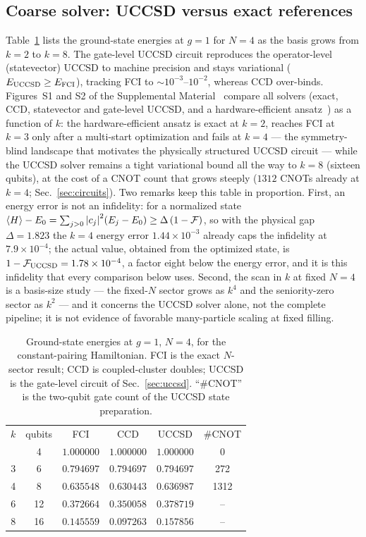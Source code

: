 \documentclass[
  aps,            %
  prc,            %
  reprint,        %
  superscriptaddress,
  floatfix,
  nofootinbib
]{revtex4-2}
\newcommand{\SM}{Supplemental Material~\cite{SM}}
\begin{document}
\subsection{Coarse solver: UCCSD versus exact references}
\label{sec:res-uccsd}
Table~\ref{tab:uccsd} lists the ground-state energies at $g=1$ for $N=4$ as the basis
grows from $k=2$ to $k=8$.  The gate-level UCCSD circuit reproduces the operator-level
(statevector) UCCSD to machine precision and stays variational ($E_{\rm UCCSD}\ge
E_{\rm FCI}$), tracking FCI to $\sim10^{-3}$--$10^{-2}$, whereas CCD over-binds.
Figures~S1 and S2 of the \SM{} compare all solvers (exact, CCD, statevector
and gate-level UCCSD, and a hardware-efficient ansatz~\cite{Kandala2017}) as
a function of $k$: the hardware-efficient ansatz is exact at $k=2$, reaches
FCI at $k=3$ only after a multi-start optimization and fails at $k=4$ --- the
symmetry-blind landscape that motivates the physically structured UCCSD
circuit --- while the UCCSD solver remains a tight variational bound all the
way to $k=8$ (sixteen qubits), at the cost of a CNOT count that grows steeply
($1312$ CNOTs already at $k=4$; Sec.~\ref{sec:circuits}).
Two remarks keep this table in proportion.  First, an energy error is not an
infidelity: for a normalized state $\expval{H}-E_0=\sum_{j>0}\abs{c_j}^2(E_j-E_0)
\ge\Delta\,(1-\mathcal F)$, so with the physical gap $\Delta=1.823$ the $k=4$
energy error $1.44\times10^{-3}$ already caps the infidelity at
$7.9\times10^{-4}$; the actual value, obtained from the optimized state, is
$1-\mathcal F_{\rm UCCSD}=1.78\times10^{-4}$, a factor eight below the energy
error, and it is this infidelity that every comparison below uses.  Second, the
scan in $k$ at fixed $N=4$ is a basis-size study --- the fixed-$N$ sector grows
as $k^{4}$ and the seniority-zero sector as $k^{2}$ --- and it concerns the
UCCSD solver alone, not the complete pipeline; it is not evidence of favorable
many-particle scaling at fixed filling.

\begin{table}[t]
\caption{\label{tab:uccsd}Ground-state energies at $g=1$, $N=4$, for the
constant-pairing Hamiltonian.  FCI is the exact $N$-sector result; CCD is
coupled-cluster doubles; UCCSD is the gate-level circuit of Sec.~\ref{sec:uccsd}.
``\#CNOT'' is the two-qubit gate count of the UCCSD state preparation.}
\begin{ruledtabular}
\begin{tabular}{cccccc}
$k$ & qubits & FCI & CCD & UCCSD & \#CNOT\\
\colrule
2 & 4  & $1.000000$ & $1.000000$ & $1.000000$ & 0\\
3 & 6  & $0.794697$ & $0.794697$ & $0.794697$ & 272\\
4 & 8  & $0.635548$ & $0.630443$ & $0.636987$ & 1312\\
6 & 12 & $0.372664$ & $0.350058$ & $0.378719$ & --\\
8 & 16 & $0.145559$ & $0.097263$ & $0.157856$ & --\\
\end{tabular}
\end{ruledtabular}
\end{table}
\end{document}
